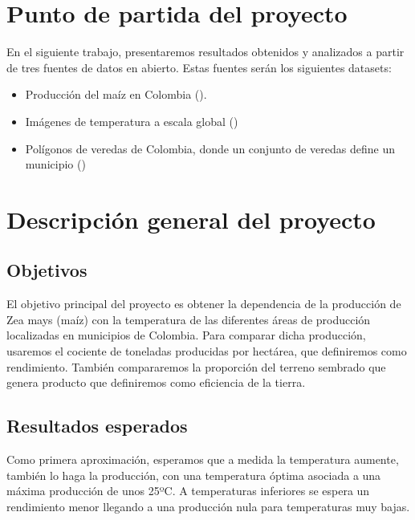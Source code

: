 \documentclass[12pt, spanish]{article}
\begin{document}
\setlength{\parskip}{1em} %
\tableofcontents 
\listoftables
\newpage
{}
\setcounter{page}{1}

\section{Punto de partida del proyecto}

En el siguiente trabajo, presentaremos resultados obtenidos y analizados a partir de tres fuentes de datos en abierto. Estas fuentes serán los siguientes datasets:

\begin{itemize}
    \item Producción del maíz en Colombia (\cite{GobiernodeColombia2018}).
    
    \item Imágenes de temperatura a escala global (\cite{NASALPDAACattheUSGSEROSCenter2019})
    
    \item Polígonos de veredas de Colombia, donde un conjunto de veredas define un municipio (\cite{DANECOL2017})
\end{itemize}


\section{Descripción general del proyecto}

\subsection{Objetivos}

El objetivo principal del proyecto es obtener la dependencia de la producción de Zea mays (maíz) con la temperatura de las diferentes áreas de producción localizadas en municipios de Colombia. Para comparar dicha producción, usaremos el cociente de toneladas producidas por hectárea, que definiremos como rendimiento. También compararemos la proporción del terreno sembrado que genera producto que definiremos como eficiencia de la tierra.


\subsection{Resultados esperados}
Como primera aproximación, esperamos que a medida la temperatura aumente, también lo haga la producción, con una temperatura óptima asociada a una máxima producción de unos 25ºC. A temperaturas inferiores se espera un rendimiento menor llegando a una producción nula para temperaturas muy bajas.
\end{document}
